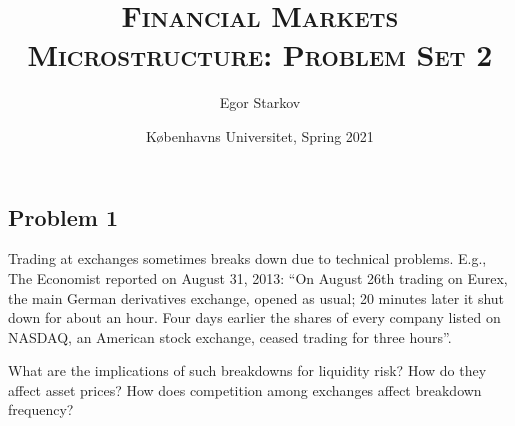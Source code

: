 \documentclass[11pt
, answers
]{exam}
\begin{document}
	
	
\title{\textsc{Financial Markets Microstructure: Problem Set 2}}
\date{K{\o}benhavns Universitet, Spring 2021}
\author{Egor Starkov}


\maketitle




\quad


\subsection*{Problem 1}

Trading at exchanges sometimes breaks down due to technical problems. E.g., The Economist reported on August 31, 2013: ``On August 26th trading on Eurex, the main German derivatives exchange, opened as usual; 20 minutes later it shut down for about an hour. Four days earlier the shares of every company listed on NASDAQ, an American stock exchange, ceased trading for three hours''. 

What are the implications of such breakdowns for liquidity risk? How do they affect asset prices? How does competition among exchanges affect breakdown frequency?
\end{document}
